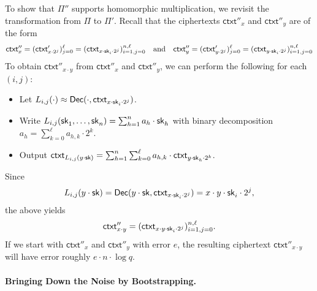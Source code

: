 \documentclass[10pt,twoside]{article}
\newcommand{\ctxt}{\mathsf{ctxt}}
\begin{document}
To show that $\Pi''$ supports homomorphic multiplication, we revisit the transformation from $\Pi$ to $\Pi'$.
Recall that the ciphertexts $\ctxt''_x$ and $\ctxt''_y$ are of the form
\begin{align*}
    \ctxt''_x = (\ctxt'_{x \cdot 2^j})_{j=0}^\ell = (\ctxt_{x \cdot \sk_i \cdot 2^j})_{i=1,j=0}^{n,\ell}
    && \text{and} &&
    \ctxt''_y = (\ctxt'_{y \cdot 2^j})_{j=0}^\ell = (\ctxt_{y \cdot \sk_i \cdot 2^j})_{i=1,j=0}^{n,\ell}
\end{align*}
To obtain $\ctxt''_{x \cdot y}$ from $\ctxt''_x$ and $\ctxt''_y$, we can perform the following for each $(i,j)$:
\begin{itemize}
    \item Let $L_{i,j}(\cdot) \approx \dec(\cdot, \ctxt_{x \cdot \sk_i \cdot 2^j})$.
    \item Write $L_{i,j}(\sk_1,\ldots,\sk_n) = \sum_{h=1}^n a_h \cdot \sk_h$ with binary decomposition $a_h = \sum_{k=0}^\ell a_{h,k} \cdot 2^k$.
    \item Output $\ctxt_{L_{i,j}(y \cdot \sk)} = \sum_{h=1}^n \sum_{k=0}^\ell a_{h,k} \cdot \ctxt_{y \cdot \sk_h \cdot 2^k}$.
\end{itemize}
Since 
\[
    L_{i,j}(y \cdot \sk) = \dec(y \cdot \sk, \ctxt_{x \cdot \sk_i \cdot 2^j}) = x \cdot y \cdot \sk_i \cdot 2^j,
\] 
the above yields
\[
    \ctxt''_{x \cdot y} = (\ctxt_{x \cdot y \cdot \sk_i \cdot 2^j})_{i=1,j=0}^{n,\ell}.
\]
If we start with $\ctxt''_x$ and $\ctxt''_y$ with error $e$, the resulting ciphertext $\ctxt''_{x \cdot y}$ will have error roughly $e \cdot n \cdot \log q$.

\paragraph{Bringing Down the Noise by Bootstrapping.}
\end{document}
